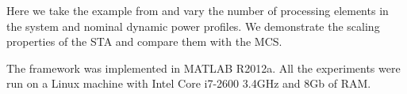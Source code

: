 Here we take the example from  and vary the number of processing elements in the system and nominal dynamic power profiles. We demonstrate the scaling properties of the STA and compare them with the MCS.

The framework was implemented in MATLAB R2012a. All the experiments were run on a Linux machine with Intel Core i7-2600 3.4GHz and 8Gb of RAM.
